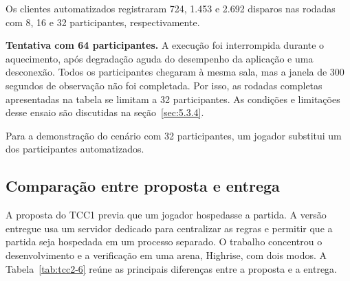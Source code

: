 Os clientes automatizados registraram 724, 1.453 e 2.692 disparos nas rodadas com 8, 16 e 32 participantes, respectivamente.

\textbf{Tentativa com 64 participantes.} A execução foi interrompida durante o aquecimento, após degradação aguda do desempenho da aplicação e uma desconexão. Todos os participantes chegaram à mesma sala, mas a janela de 300 segundos de observação não foi completada. Por isso, as rodadas completas apresentadas na tabela se limitam a 32 participantes. As condições e limitações desse ensaio são discutidas na seção~\ref{sec:5.3.4}.

Para a demonstração do cenário com 32 participantes, um jogador substitui um dos participantes automatizados.

\subsection{Comparação entre proposta e entrega}\label{sec:5.3.3}

A proposta do TCC1 previa que um jogador hospedasse a partida. A versão entregue usa um servidor dedicado para centralizar as regras e permitir que a partida seja hospedada em um processo separado. O trabalho concentrou o desenvolvimento e a verificação em uma arena, Highrise, com dois modos. A Tabela~\ref{tab:tcc2-6} reúne as principais diferenças entre a proposta e a entrega.

